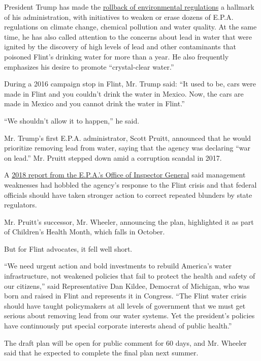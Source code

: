 President Trump has made the
\href{https://www.nytimes3xbfgragh.onion/interactive/2019/climate/trump-environment-rollbacks.html}{rollback
of environmental regulations} a hallmark of his administration, with
initiatives to weaken or erase dozens of E.P.A. regulations on climate
change, chemical pollution and water quality. At the same time, he has
also called attention to the concerns about lead in water that were
ignited by the discovery of high levels of lead and other contaminants
that poisoned Flint's drinking water for more than a year. He also
frequently emphasizes his desire to promote ``crystal-clear water.''

During a 2016 campaign stop in Flint, Mr. Trump said: ``It used to be,
cars were made in Flint and you couldn't drink the water in Mexico. Now,
the cars are made in Mexico and you cannot drink the water in Flint.''

``We shouldn't allow it to happen,'' he said.

Mr. Trump's first E.P.A. administrator, Scott Pruitt, announced that he
would prioritize removing lead from water, saying that the agency was
declaring ``war on lead.'' Mr. Pruitt stepped down amid a corruption
scandal in 2017.

A
\href{https://www.nytimes3xbfgragh.onion/2018/07/19/us/flint-water-crisis-epa.html}{2018
report from the E.P.A.'s Office of Inspector General} said management
weaknesses had hobbled the agency's response to the Flint crisis and
that federal officials should have taken stronger action to correct
repeated blunders by state regulators.

Mr. Pruitt's successor, Mr. Wheeler, announcing the plan, highlighted it
as part of Children's Health Month, which falls in October.

But for Flint advocates, it fell well short.

``We need urgent action and bold investments to rebuild America's water
infrastructure, not weakened policies that fail to protect the health
and safety of our citizens,'' said Representative Dan Kildee, Democrat
of Michigan, who was born and raised in Flint and represents it in
Congress. ``The Flint water crisis should have taught policymakers at
all levels of government that we must get serious about removing lead
from our water systems. Yet the president's policies have continuously
put special corporate interests ahead of public health.''

The draft plan will be open for public comment for 60 days, and Mr.
Wheeler said that he expected to complete the final plan next summer.

